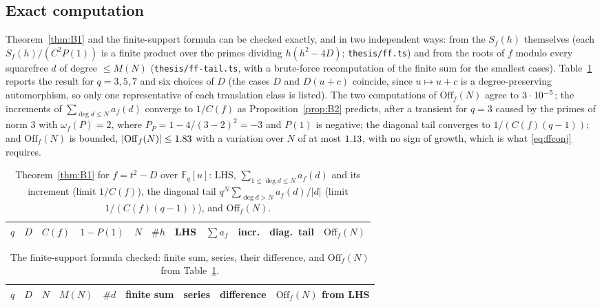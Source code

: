 \documentclass[11pt,a4paper]{article}
\newcommand{\F}{\mathbb{F}}
\begin{document}
\subsection{Exact computation}

Theorem~\ref{thm:B1} and the finite-support formula can be checked exactly, and in two independent
ways: from the $S_f(h)$ themselves (each $S_f(h)/(C^2P(1))$ is a finite product over the primes dividing
$h(h^2-4D)$; \texttt{thesis/ff.ts}) and from the roots of $f$ modulo every squarefree $d$ of degree
$\le M(N)$ (\texttt{thesis/ff-tail.ts}, with a brute-force recomputation of the finite sum for the
smallest cases). Table~\ref{tab:ff} reports the result for $q=3,5,7$ and six choices of $D$ (the cases
$D$ and $D(u+c)$ coincide, since $u\mapsto u+c$ is a degree-preserving automorphism, so only one
representative of each translation class is listed). The two computations of $\mathrm{Off}_f(N)$ agree to
$3\cdot10^{-5}$; the increments of $\sum_{\deg d\le N}a_f(d)$ converge to $1/C(f)$ as
Proposition~\ref{prop:B2} predicts, after a transient for $q=3$ caused by the primes of norm $3$ with
$\omega_f(P)=2$, where $P_P=1-4/(3-2)^2=-3$ and $P(1)$ is negative; the diagonal tail converges to
$1/(C(f)(q-1))$; and $\mathrm{Off}_f(N)$ is bounded, $|\mathrm{Off}_f(N)|\le1.83$ with a variation
over $N$ of at most $1.13$, with no sign of growth, which is what \eqref{eq:ffconj} requires.

\begin{table}[h]
\centering\footnotesize\setlength{\tabcolsep}{4pt}
\caption{Theorem~\ref{thm:B1} for $f=t^2-D$ over $\F_q[u]$: LHS, $\sum_{1\le\deg d\le N}a_f(d)$ and its
increment (limit $1/C(f)$), the diagonal tail $q^N\sum_{\deg d>N}a_f(d)/|d|$ (limit $1/(C(f)(q-1))$),
and $\mathrm{Off}_f(N)$.}\label{tab:ff}
\begin{tabular}{rlrrrrrrrrr}
\toprule
$q$ & $D$ & $C(f)$ & $1-P(1)$ & $N$ & $\#h$ & LHS & $\sum a_f$ & incr. & diag.\ tail & $\mathrm{Off}_f(N)$\\
\midrule

\end{tabular}
\end{table}

\begin{table}[h]
\centering\footnotesize\setlength{\tabcolsep}{5pt}
\caption{The finite-support formula checked: finite sum, series, their difference, and
$\mathrm{Off}_f(N)$ from Table~\ref{tab:ff}.}\label{tab:fftail}
\begin{tabular}{rlrrrrrrr}
\toprule
$q$ & $D$ & $N$ & $M(N)$ & $\#d$ & finite sum & series & difference & $\mathrm{Off}_f(N)$ from LHS\\
\midrule

\end{tabular}
\end{table}
\end{document}
